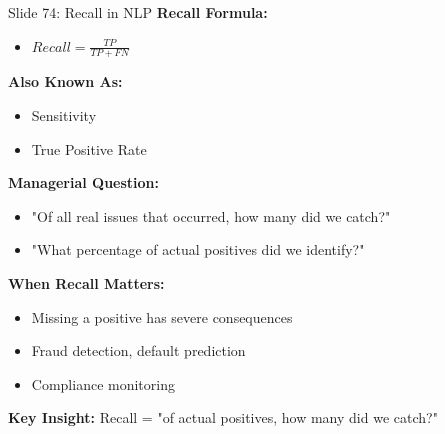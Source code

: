 \documentclass[8pt]{beamer}
\begin{document}
	\begin{frame}{Slide 74: Recall in NLP}
		\fontsize{6.5}{7.5}\selectfont
		\textbf{Recall Formula:}
		\begin{itemize}
			\item $Recall = \frac{TP}{TP + FN}$
		\end{itemize}
		
		\vspace{0.1cm}
		\textbf{Also Known As:}
		\begin{itemize}
			\item Sensitivity
			\item True Positive Rate
		\end{itemize}
		
		\vspace{0.1cm}
		\textbf{Managerial Question:}
		\begin{itemize}
			\item "Of all real issues that occurred, how many did we catch?"
			\item "What percentage of actual positives did we identify?"
		\end{itemize}
		
		\vspace{0.1cm}
		\textbf{When Recall Matters:}
		\begin{itemize}
			\item Missing a positive has severe consequences
			\item Fraud detection, default prediction
			\item Compliance monitoring
		\end{itemize}
		
		\textcolor{myblue}{\textbf{Key Insight:}} Recall = "of actual positives, how many did we catch?"
	\end{frame}
	
\end{document}
